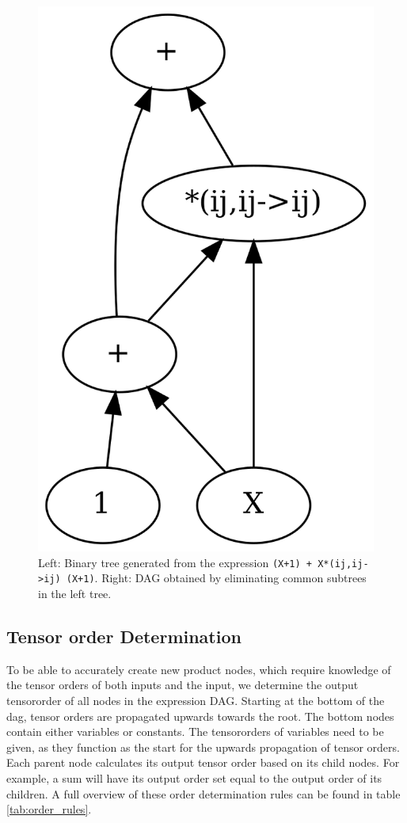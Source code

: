 \documentclass[12pt, a4paper]{report}
\begin{document}
\begin{figure}
\begin{minipage}{7cm}
        \includegraphics[scale=0.15]{dag.png}
    \end{minipage}
    \caption{Left: Binary tree generated from the expression \texttt{(X+1) + X*(ij,ij->ij) (X+1)}. Right: DAG obtained by eliminating common subtrees in the left tree.}
    \label{fig:tree_to_dag}
\end{figure}
\FloatBarrier
\subsection{Tensor order Determination}
To be able to accurately create new product nodes, which require knowledge of the tensor orders of both inputs and the input, we determine the output tensororder of all nodes in the expression DAG.
Starting at the bottom of the dag, tensor orders are propagated upwards towards the root.
The bottom nodes contain either variables or constants.
The tensororders of variables need to be given, as they function as the start for the upwards propagation of tensor orders.
Each parent node calculates its output tensor order based on its child nodes.
For example, a sum will have its output order set equal to the output order of its children.
A full overview of these order determination rules can be found in table \ref{tab:order_rules}.
\end{document}
